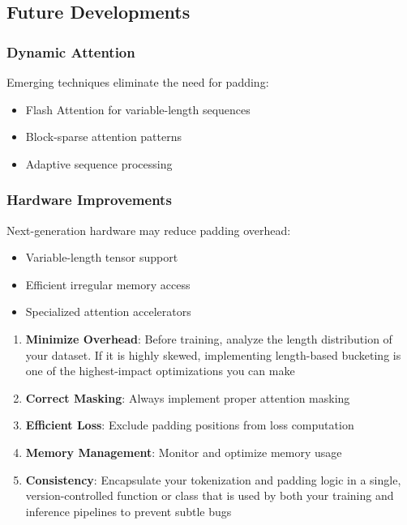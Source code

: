 \subsection{Future Developments}

\subsubsection{Dynamic Attention}
Emerging techniques eliminate the need for padding:
\begin{itemize}
\item Flash Attention for variable-length sequences
\item Block-sparse attention patterns
\item Adaptive sequence processing
\end{itemize}

\subsubsection{Hardware Improvements}
Next-generation hardware may reduce padding overhead:
\begin{itemize}
\item Variable-length tensor support
\item Efficient irregular memory access
\item Specialized attention accelerators
\end{itemize}

\begin{principle}
\begin{enumerate}
\item \textbf{Minimize Overhead}: Before training, analyze the length distribution of your dataset. If it is highly skewed, implementing length-based bucketing is one of the highest-impact optimizations you can make
\item \textbf{Correct Masking}: Always implement proper attention masking
\item \textbf{Efficient Loss}: Exclude padding positions from loss computation
\item \textbf{Memory Management}: Monitor and optimize memory usage
\item \textbf{Consistency}: Encapsulate your tokenization and padding logic in a single, version-controlled function or class that is used by both your training and inference pipelines to prevent subtle bugs
\end{enumerate}
\end{principle}


